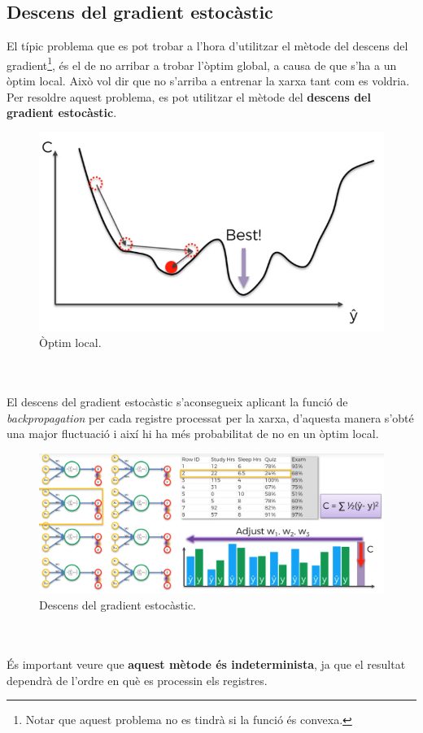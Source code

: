 \documentclass[12pt]{article}
\begin{document}
\clearpage
\subsection{Descens del gradient estocàstic\label{dge}}
El típic problema que es pot trobar a l'hora d'utilitzar el mètode del descens del gradient\footnote{Notar que aquest problema no es tindrà si la funció és convexa.}, és el de no arribar a trobar l'òptim global, a causa de que s'ha  a un òptim local. 
Això vol dir que no s'arriba a entrenar la xarxa tant com es voldria. Per resoldre aquest problema, es pot utilitzar el mètode del \textbf{descens del gradient estocàstic}.
\begin{figure}[h!]
	\centering
	\includegraphics[scale=0.4]{imatges/dge/1dge.png}
	\caption{Òptim local.}
\end{figure}
\\\\El descens del gradient estocàstic s'aconsegueix aplicant la funció de \textit{backpropagation} per cada registre processat per la xarxa, d'aquesta manera s'obté una major fluctuació i així hi ha més probabilitat de no  en un òptim local.
\pagebreak
\begin{figure}[h!]
	\centering
	\includegraphics[scale=0.4]{imatges/dge/2dge.png}
	\caption{Descens del gradient estocàstic.}
\end{figure}
\\\\És important veure que \textbf{aquest mètode és indeterminista}, ja que el resultat dependrà de l'ordre en què es processin els registres.
\end{document}
